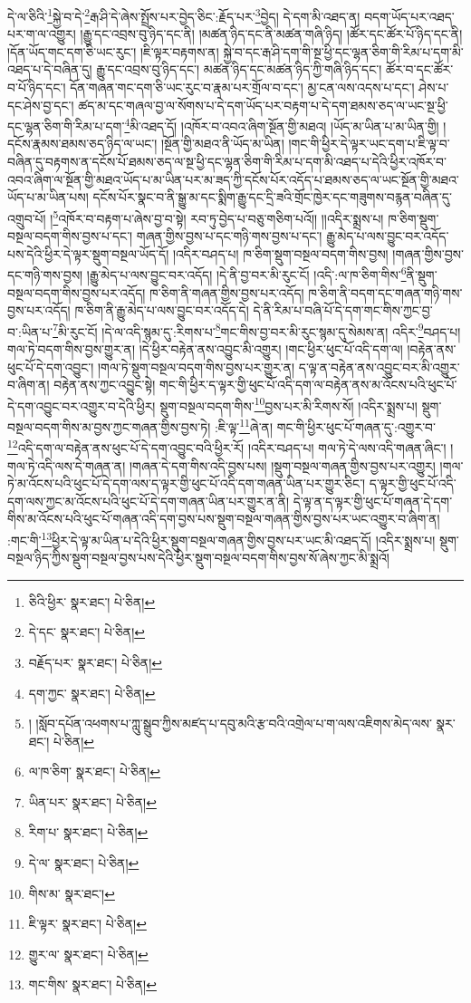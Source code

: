 དེ་ལ་ཅིའི་\footnote{ཅིའི་ཕྱིར་  སྣར་ཐང་།  པེ་ཅིན། }སྐྱེ་བ་དེ་\footnote{དེ་དང་  སྣར་ཐང་།  པེ་ཅིན། }རྒ་ཤི་དེ་ཞེས་སྤྲོས་པར་བྱེད་ཅིང་:རྗོད་པར་\footnote{བརྗོད་པར་  སྣར་ཐང་།  པེ་ཅིན། }བྱེད། དེ་དག་མི་འཐད་ན། བདག་ཡོད་པར་འཐད་པར་ག་ལ་འགྱུར། །རྒྱུ་དང་འབྲས་བུ་ཉིད་དང་ནི། །མཚན་ཉིད་དང་ནི་མཚན་གཞི་ཉིད། །ཚོར་དང་ཚོར་པོ་ཉིད་དང་ནི། །དོན་ཡོད་གང་དག་ཅི་ཡང་རུང་། །ཇི་ལྟར་བརྟགས་ན། སྐྱེ་བ་དང་རྒ་ཤི་དག་གི་སྔ་ཕྱི་དང་ལྷན་ཅིག་གི་རིམ་པ་དག་མི་འཐད་པ་དེ་བཞིན་དུ། རྒྱུ་དང་འབྲས་བུ་ཉིད་དང་། མཚན་ཉིད་དང་མཚན་ཉིད་ཀྱི་གཞི་ཉིད་དང་། ཚོར་བ་དང་ཚོར་བ་པོ་ཉིད་དང་། དོན་གཞན་གང་དག་ཅི་ཡང་རུང་བ་རྣམ་པར་གྲོལ་བ་དང་། མྱ་ངན་ལས་འདས་པ་དང་། ཤེས་པ་དང་ཤེས་བྱ་དང་། ཚད་མ་དང་གཞལ་བྱ་ལ་སོགས་པ་དེ་དག་ཡོད་པར་བརྟག་པ་དེ་དག་ཐམས་ཅད་ལ་ཡང་སྔ་ཕྱི་དང་ལྷན་ཅིག་གི་རིམ་པ་དག་\footnote{དག་ཀྱང་  སྣར་ཐང་།  པེ་ཅིན། }མི་འཐད་དོ། །འཁོར་བ་འབའ་ཞིག་སྔོན་གྱི་མཐའ། །ཡོད་མ་ཡིན་པ་མ་ཡིན་གྱི། །
དངོས་རྣམས་ཐམས་ཅད་ཉིད་ལ་ཡང་། །སྔོན་གྱི་མཐའ་ནི་ཡོད་མ་ཡིན། །གང་གི་ཕྱིར་དེ་ལྟར་ཡང་དག་པ་ཇི་ལྟ་བ་བཞིན་དུ་བརྟགས་ན་དངོས་པོ་ཐམས་ཅད་ལ་སྔ་ཕྱི་དང་ལྷན་ཅིག་གི་རིམ་པ་དག་མི་འཐད་པ་དེའི་ཕྱིར་འཁོར་བ་འབའ་ཞིག་ལ་སྔོན་གྱི་མཐའ་ཡོད་པ་མ་ཡིན་པར་མ་ཟད་ཀྱི་དངོས་པོར་འདོད་པ་ཐམས་ཅད་ལ་ཡང་སྔོན་གྱི་མཐའ་ཡོད་པ་མ་ཡིན་པས། དངོས་པོར་སྣང་བ་ནི་སྒྱུ་མ་དང་སྨིག་རྒྱུ་དང་དྲི་ཟའི་གྲོང་ཁྱེར་དང་གཟུགས་བརྙན་བཞིན་དུ་འགྲུབ་པོ། །\footnote{། །སློབ་དཔོན་འཕགས་པ་ཀླུ་སྒྲུབ་ཀྱིས་མཛད་པ་དབུ་མའི་རྩ་བའི་འགྲེལ་པ་ག་ལས་འཇིགས་མེད་ལས་  སྣར་ཐང་།  པེ་ཅིན། }འཁོར་བ་བརྟག་པ་ཞེས་བྱ་བ་སྟེ། རབ་ཏུ་བྱེད་པ་བཅུ་གཅིག་པའོ།། །།འདིར་སྨྲས་པ། ཁ་ཅིག་སྡུག་བསྔལ་བདག་གིས་བྱས་པ་དང་། གཞན་གྱིས་བྱས་པ་དང་གཉི་གས་བྱས་པ་དང་། རྒྱུ་མེད་པ་ལས་བྱུང་བར་འདོད་པས་དེའི་ཕྱིར་དེ་ལྟར་སྡུག་བསྔལ་ཡོད་དོ། །འདིར་བཤད་པ། ཁ་ཅིག་སྡུག་བསྔལ་བདག་གིས་བྱས། །གཞན་གྱིས་བྱས་དང་གཉི་གས་བྱས། །རྒྱུ་མེད་པ་ལས་བྱུང་བར་འདོད། །དེ་ནི་བྱ་བར་མི་རུང་ངོ། །འདི་:ལ་ཁ་ཅིག་གིས་\footnote{ལ་ཁ་ཅིག་  སྣར་ཐང་།  པེ་ཅིན། }ནི་སྡུག་བསྔལ་བདག་གིས་བྱས་པར་འདོད། ཁ་ཅིག་ནི་གཞན་གྱིས་བྱས་པར་འདོད། ཁ་ཅིག་ནི་བདག་དང་གཞན་གཉི་གས་བྱས་པར་འདོད། ཁ་ཅིག་ནི་རྒྱུ་མེད་པ་ལས་བྱུང་བར་འདོད་དེ། དེ་ནི་རིམ་པ་བཞི་པོ་དེ་དག་གང་གིས་ཀྱང་བྱ་བ་:ཡིན་པ་\footnote{ཡིན་པར་  སྣར་ཐང་།  པེ་ཅིན། }མི་རུང་ངོ། །དེ་ལ་འདི་སྙམ་དུ་:རིགས་པ་\footnote{རིག་པ་  སྣར་ཐང་།  པེ་ཅིན། }གང་གིས་བྱ་བར་མི་རུང་སྙམ་དུ་སེམས་ན། འདིར་\footnote{དེ་ལ་  སྣར་ཐང་།  པེ་ཅིན། }བཤད་པ། གལ་ཏེ་བདག་གིས་བྱས་གྱུར་ན། །དེ་ཕྱིར་བརྟེན་ནས་འབྱུང་མི་འགྱུར། །གང་ཕྱིར་ཕུང་པོ་འདི་དག་ལ། །བརྟེན་ནས་ཕུང་པོ་དེ་དག་འབྱུང་། །གལ་ཏེ་སྡུག་བསྔལ་བདག་གིས་བྱས་པར་གྱུར་ན། ད་ལྟ་ན་བརྟེན་ནས་འབྱུང་བར་མི་འགྱུར་བ་ཞིག་ན། བརྟེན་ནས་ཀྱང་འབྱུང་སྟེ། གང་གི་ཕྱིར་ད་ལྟར་གྱི་ཕུང་པོ་འདི་དག་ལ་བརྟེན་ནས་མ་འོངས་པའི་ཕུང་པོ་དེ་དག་འབྱུང་བར་འགྱུར་བ་དེའི་ཕྱིར། སྡུག་བསྔལ་བདག་གིས་\footnote{གིས་མ་  སྣར་ཐང་། }བྱས་པར་མི་རིགས་སོ། །འདིར་སྨྲས་པ། སྡུག་བསྔལ་བདག་གིས་མ་བྱས་ཀྱང་གཞན་གྱིས་བྱས་ཏེ། :ཇི་ལྟ་\footnote{ཇི་ལྟར་  སྣར་ཐང་།  པེ་ཅིན། }ཞེ་ན། གང་གི་ཕྱིར་ཕུང་པོ་གཞན་དུ་:འགྱུར་བ་\footnote{གྱུར་ལ་  སྣར་ཐང་།  པེ་ཅིན། }འདི་དག་ལ་བརྟེན་ནས་ཕུང་པོ་དེ་དག་འབྱུང་བའི་ཕྱིར་རོ། །འདིར་བཤད་པ། གལ་ཏེ་དེ་ལས་འདི་གཞན་ཞིང་། །གལ་ཏེ་འདི་ལས་དེ་གཞན་ན། །གཞན་དེ་དག་གིས་འདི་བྱས་པས། །སྡུག་བསྔལ་གཞན་གྱིས་བྱས་པར་འགྱུར། །གལ་ཏེ་མ་འོངས་པའི་ཕུང་པོ་དེ་དག་ལས་ད་ལྟར་གྱི་ཕུང་པོ་འདི་དག་གཞན་ཡིན་པར་གྱུར་ཅིང་། ད་ལྟར་གྱི་ཕུང་པོ་འདི་དག་ལས་ཀྱང་མ་འོངས་པའི་ཕུང་པོ་དེ་དག་གཞན་ཡིན་པར་གྱུར་ན་ནི། དེ་ལྟ་ན་ད་ལྟར་གྱི་ཕུང་པོ་གཞན་དེ་དག་གིས་མ་འོངས་པའི་ཕུང་པོ་གཞན་འདི་དག་བྱས་པས་སྡུག་བསྔལ་གཞན་གྱིས་བྱས་པར་ཡང་འགྱུར་བ་ཞིག་ན། :གང་གི་\footnote{གང་གིས་  སྣར་ཐང་།  པེ་ཅིན། }ཕྱིར་དེ་ལྟ་མ་ཡིན་པ་དེའི་ཕྱིར་སྡུག་བསྔལ་གཞན་གྱིས་བྱས་པར་ཡང་མི་འཐད་དོ། །འདིར་སྨྲས་པ། སྡུག་བསྔལ་ཉིད་ཀྱིས་སྡུག་བསྔལ་བྱས་པས་དེའི་ཕྱིར་སྡུག་བསྔལ་བདག་གིས་བྱས་སོ་ཞེས་ཀྱང་མི་སྨྲའོ། 